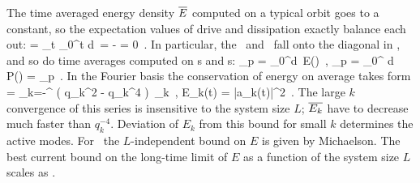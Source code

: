 The time averaged energy density  $\overline{E}$
computed on a typical orbit goes to a constant, so
the expectation values  of drive and dissipation
exactly balance each out:
\beq
      =
    \lim_{t\rightarrow \infty}
         \int_0^t d\tau \, \dot{\expctE}
=
       - 
= 0
    \,.
In particular, the \eqva\
and \reqva\ fall onto the diagonal in ,
and so do time averages computed on \po s and \rpo s:
\beq
{}_p =
 \int_0^d\tau \, E(\tau)
    \,,\qquad
{}_p =
 \int_0^ d\tau \, P(\tau)
    =
      _p
    \,.
\label{poE}
\eeq
In the Fourier basis  the conservation of energy on average
takes form
 = \sum_{k=-\infty}^{\infty} ( q_k^2 - q_k^4 )\,
    _k
\,,\qquad
E_k(t) =  {\textstyle{}} |a_k(t)|^2
\,.
The large $k$ convergence of this series is insensitive to the
system size $L$; $\overline{E_k}$ have to decrease much faster than
$q_k^{-4}$.
Deviation of $E_k$ from this bound for small $k$ determines the active modes.
For \eqva\ the $L$-independent bound
    on $E$ is given by Michaelson.
The best current bound on the long-time limit
of $E$
as a function of the system size $L$ scales as
.
